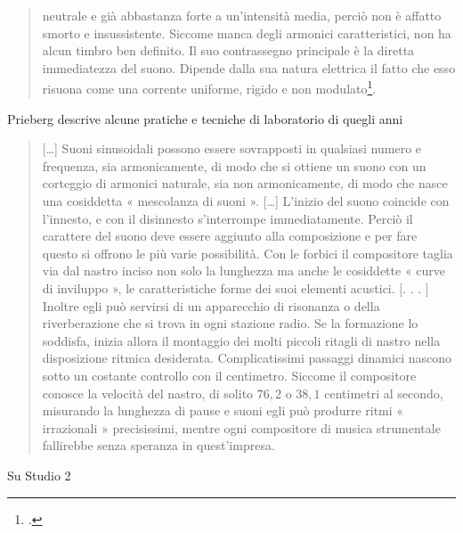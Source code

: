 \begin{quote}
  neutrale e già abbastanza forte a un’intensità media, perciò non è affatto smorto e insussistente. Siccome manca degli armonici caratteristici, non ha alcun timbro ben definito. Il suo contrassegno principale è la diretta immediatezza del suono. Dipende dalla sua natura elettrica il fatto che esso risuona come una corrente uniforme, rigido e non modulato\footcite[\emph{idem}]{prieberg:mexm}.
\end{quote}

Prieberg descrive alcune pratiche e tecniche di laboratorio di quegli anni

\begin{quote}
	[\ldots] Suoni sinusoidali possono essere sovrapposti in qualsiasi numero e frequenza, sia armonicamente, di modo che si ottiene un suono con un corteggio di armonici naturale, sia non armonicamente, di modo che nasce una cosiddetta « mescolanza di suoni ». [\ldots] L’inizio del suono coincide con l’innesto, e con il disinnesto s’interrompe immediatamente. Perciò il carattere del suono deve essere aggiunto alla composizione e per fare questo si offrono le più varie possibilità. Con le forbici il compositore taglia via dal nastro inciso non solo la lunghezza ma anche le cosiddette « curve di inviluppo », le caratteristiche forme dei suoi elementi acustici. [. . . ] Inoltre egli può servirsi di un apparecchio di risonanza o della riverberazione che si trova in ogni stazione radio. Se la formazione lo soddisfa, inizia allora il montaggio dei molti piccoli ritagli di nastro nella disposizione ritmica desiderata.
	Complicatissimi passaggi dinamici nascono sotto un costante controllo con il centimetro. Siccome il compositore conosce la velocità del nastro, di solito $ 76,2 $ o $ 38,1 $ centimetri al secondo, misurando la lunghezza di pause e suoni egli può produrre ritmi « irrazionali » precisissimi, mentre ogni compositore di musica strumentale fallirebbe senza speranza in quest’impresa.
\end{quote}

Su Studio 2

